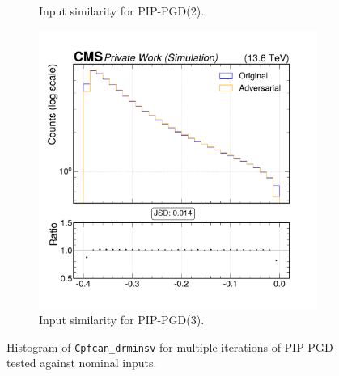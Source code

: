 \begin{figure}[htbp]
\begin{subfigure}[t]{0.32\textwidth}
    \caption*{Input similarity for PIP-PGD(2).}
  \end{subfigure}\hfill
  \begin{subfigure}[t]{0.32\textwidth}
    \includegraphics[width=\linewidth]{media/output/features/compare/combined_it_3/cmp_cpf_arr_Cpfcan_drminsv.pdf}
    \caption*{Input similarity for PIP-PGD(3).}
  \end{subfigure}

  \caption*{Histogram of \texttt{Cpfcan\_drminsv} for multiple iterations of PIP-PGD tested against nominal inputs.}
  \label{fig:combined_input_Cpfcan_drminsv}
\end{figure}

